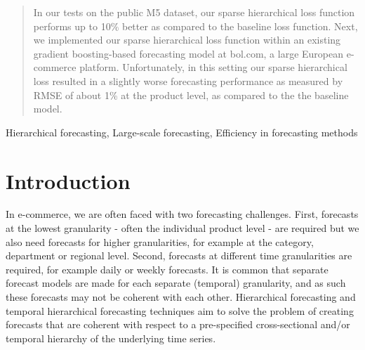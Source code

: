 \documentclass[preprint, 3p, times, twocolumn]{elsarticle}
\begin{document}
\begin{frontmatter}
\begin{abstract}
  In our tests on the public M5 dataset, our sparse hierarchical loss function performs up to 10\% better as compared to the baseline loss function. Next, we implemented our sparse hierarchical loss function within an existing gradient boosting-based forecasting model at bol.com, a large European e-commerce platform. Unfortunately, in this setting our sparse hierarchical loss resulted in a slightly worse forecasting performance as measured by RMSE of about 1\% at the product level, as compared to the the baseline model. 
  
\end{abstract}

\begin{keyword}
  Hierarchical forecasting, Large-scale forecasting, Efficiency in forecasting methods
\end{keyword}

\end{frontmatter}

\section{Introduction} \label{sec:intro}
In e-commerce, we are often faced with two forecasting challenges. First, forecasts at the lowest granularity - often the individual product level - are required but we also need forecasts for higher granularities, for example at the category, department or regional level. Second, forecasts at different time granularities are required, for example daily or weekly forecasts. It is common that separate forecast models are made for each separate (temporal) granularity, and as such these forecasts may not be coherent with each other. Hierarchical forecasting \cite{hyndman_optimal_2011} and temporal hierarchical forecasting techniques \cite{athanasopoulos_forecasting_2017,rangapuram_coherent_2023,theodosiou_forecasting_2021} aim to solve the problem of creating forecasts that are coherent with respect to a pre-specified cross-sectional and/or temporal hierarchy of the underlying time series. 

\end{document}
